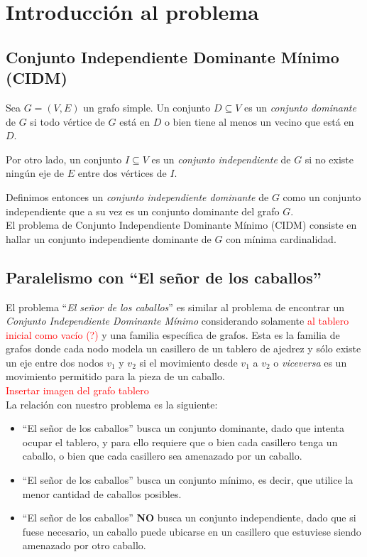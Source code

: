 \section{Introducci\'on al problema}
\subsection{Conjunto Independiente Dominante M\'inimo (CIDM)}

Sea $G = (V, E)$ un grafo simple. Un conjunto $D \subseteq V$ es un \emph{conjunto dominante} de $G$ si todo v\'ertice de $G$ est\'a en $D$ o bien tiene al menos un vecino que est\'a en $D$. 

Por otro lado, un conjunto $I \subseteq V$ es un \emph{conjunto independiente} de $G$ si no existe ning\'un eje de $E$ entre dos v\'ertices de $I$. 

Definimos entonces un \emph{conjunto independiente dominante} de $G$ como un conjunto independiente que a su vez es un conjunto dominante del grafo $G$.\\

El problema de Conjunto Independiente Dominante M\'inimo (CIDM) consiste en hallar un conjunto independiente dominante de $G$ con m\'inima cardinalidad.

\subsection{Paralelismo con ``El se\~nor de los caballos''}\label{caballitos}

El problema ``\emph{El se\~nor de los caballos}'' es similar al problema de encontrar un \emph{Conjunto Independiente Dominante M\'inimo} considerando solamente \textcolor{red}{al tablero inicial como vacío (?)} y una familia específica de grafos. Esta es la familia de grafos donde cada nodo modela un casillero de un tablero de ajedrez y sólo existe un eje entre dos nodos $v_1$ y $v_2$ si el movimiento desde $v_1$ a $v_2$ o \textit{viceversa} es un movimiento permitido para la pieza de un caballo.\\

\textcolor{red}{Insertar imagen del grafo tablero}\\

La relación con nuestro problema es la siguiente:
\begin{itemize}
	\item ``El se\~nor de los caballos'' busca un conjunto dominante, dado que intenta ocupar el tablero, y para ello requiere que o bien cada casillero tenga un caballo, o bien que cada casillero sea amenazado por un caballo.
	\item ``El se\~nor de los caballos'' busca un conjunto m\'inimo, es decir, que utilice la menor cantidad de caballos posibles.
	\item ``El se\~nor de los caballos'' \textbf{NO} busca un conjunto independiente, dado que si fuese necesario, un caballo puede ubicarse en un casillero que estuviese siendo amenazado por otro caballo.
	
\end{itemize}

